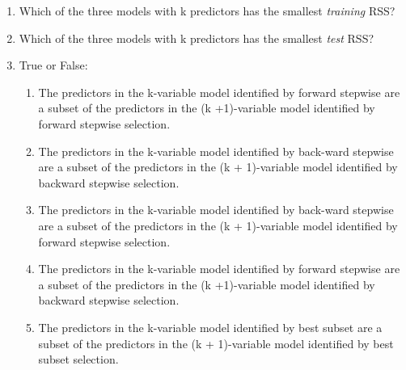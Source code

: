 \documentclass[12pt]{article}
\begin{document}
\medspace

\begin{enumerate}
    \item Which of the three models with k predictors has the smallest \emph{training} RSS?
    \item Which of the three models with k predictors has the smallest \emph{test} RSS?
    \item True or False:
          \begin{enumerate}[label=(\roman*)]
              \item The predictors in the k-variable model identified by forward stepwise are a subset of the predictors in the (k +1)-variable model identified by forward stepwise selection.
              \item The predictors in the k-variable model identified by back-ward stepwise are a subset of the predictors in the (k + 1)-variable model identified by backward stepwise selection.
              \item The predictors in the k-variable model identified by back-ward stepwise are a subset of the predictors in the (k + 1)-variable model identified by forward stepwise selection.
              \item The predictors in the k-variable model identified by forward stepwise are a subset of the predictors in the (k +1)-variable model identified by backward stepwise selection.
              \item The predictors in the k-variable model identified by best subset are a subset of the predictors in the (k + 1)-variable model identified by best subset selection.
          \end{enumerate}
\end{enumerate}

\end{document}
